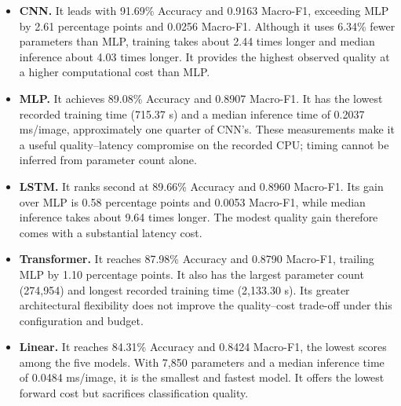 \begin{itemize}
\setlength{\itemsep}{3pt}
\setlength{\parskip}{0pt}
\item \textbf{CNN.} It leads with 91.69\% Accuracy and 0.9163 Macro-F1, exceeding MLP by 2.61 percentage points and 0.0256 Macro-F1. Although it uses 6.34\% fewer parameters than MLP, training takes about 2.44 times longer and median inference about 4.03 times longer. It provides the highest observed quality at a higher computational cost than MLP.
\item \textbf{MLP.} It achieves 89.08\% Accuracy and 0.8907 Macro-F1. It has the lowest recorded training time (715.37 s) and a median inference time of 0.2037 ms/image, approximately one quarter of CNN's. These measurements make it a useful quality--latency compromise on the recorded CPU; timing cannot be inferred from parameter count alone.
\item \textbf{LSTM.} It ranks second at 89.66\% Accuracy and 0.8960 Macro-F1. Its gain over MLP is 0.58 percentage points and 0.0053 Macro-F1, while median inference takes about 9.64 times longer. The modest quality gain therefore comes with a substantial latency cost.
\item \textbf{Transformer.} It reaches 87.98\% Accuracy and 0.8790 Macro-F1, trailing MLP by 1.10 percentage points. It also has the largest parameter count (274,954) and longest recorded training time (2,133.30 s). Its greater architectural flexibility does not improve the quality--cost trade-off under this configuration and budget.
\item \textbf{Linear.} It reaches 84.31\% Accuracy and 0.8424 Macro-F1, the lowest scores among the five models. With 7,850 parameters and a median inference time of 0.0484 ms/image, it is the smallest and fastest model. It offers the lowest forward cost but sacrifices classification quality.
\end{itemize}



